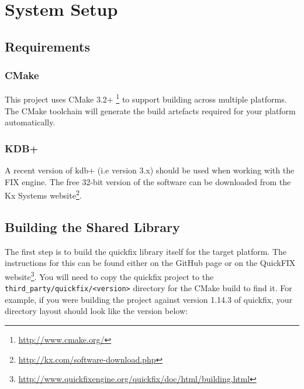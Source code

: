 \chapter{System Setup}


\section{Requirements}

\subsection{CMake}

This project uses CMake 3.2+ \footnote{\url{http://www.cmake.org/}} to support building across multiple platforms. The CMake toolchain will generate the build artefacts required for your platform automatically.

\subsection{KDB+}
A recent version of kdb+ (i.e version 3.x) should be used when working with the FIX engine. The free 32-bit version of the software can be downloaded from the Kx Systems website\footnote{\url{http://kx.com/software-download.php}}.

\section{Building the Shared Library}

The first step is to build the quickfix library itself for the target platform. The instructions for this can be found either on the GitHub page or on the QuickFIX website\footnote{\url{http://www.quickfixengine.org/quickfix/doc/html/building.html}}. You will need to copy the quickfix project to the \verb|third_party/quickfix/<version>| directory
for the CMake build to find it. For example, if you were building the project against version 1.14.3 of quickfix, your directory layout should look like the version below:

